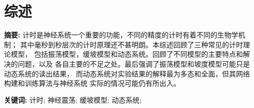 \chapter{综述}

\begin{center}
\textbf{}
\end{center}

\bigskip
\noindent \textbf{摘要: \hspace{\Han}}
计时是神经系统一个重要的功能，不同的精度的计时有着不同的生物学机制；
其中毫秒到秒层次的计时原理还不甚明朗。本综述回顾了三种常见的计时理论模型，
包括振荡模型，缓坡模型和动态系统。回顾了不同模型的主要特点和解决的问题，以及
各自主要的不足之处。最后强调了振荡模型和坡度模型可能只是动态系统的读出结果，
而动态系统对实验结果的解释最为多态和全面，但其网络构建和训练算法与神经系统
实际的情况可能仍有所出入。

\bigskip
\noindent \textbf{关键词: \hspace{\Han}}
计时;\;
神经震荡;\;
缓坡模型;\;
动态系统;\;




%




%


